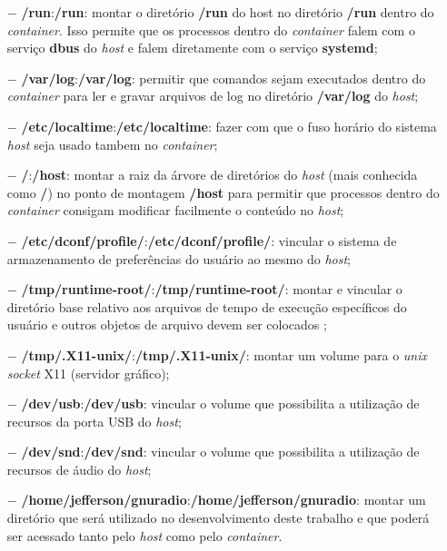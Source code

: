\documentclass[
  12pt,				%
  openright,			%
  twoside,			%
  a4paper,			%
  english,			%
  french,				%
  spanish,			%
  brazil,				%
  ]{abntex2}
\begin{document}
\begin{itemize}
  \item[$-$] \textbf{/run}:\textbf{/run}: montar o diretório \textbf{/run} do host no diretório \textbf{/run} dentro do \textit{container}. Isso permite que os processos dentro do
        \textit{container} falem com o serviço \textbf{dbus} do \textit{host} e falem diretamente com o serviço \textbf{systemd};

  \item[$-$] \textbf{/var/log}:\textbf{/var/log}: permitir que comandos sejam executados dentro do \textit{container} para ler e gravar arquivos de log no diretório
        \textbf{/var/log} do \textit{host};

  \item[$-$] \textbf{/etc/localtime}:\textbf{/etc/localtime}: fazer com que o fuso horário do sistema \textit{host} seja usado
        tambem no \textit{container};

  \item[$-$] \textbf{/}:\textbf{/host}: montar a raiz da árvore de diretórios do \textit{host} (mais conhecida como \textbf{/}) no  ponto
        de montagem \textbf{/host} para permitir que processos dentro do \textit{container} consigam modificar facilmente o conteúdo no \textit{host};

  \item[$-$] \textbf{/etc/dconf/profile/}:\textbf{/etc/dconf/profile/}: vincular o sistema de armazenamento de preferências do usuário ao mesmo do \textit{host};

  \item[$-$] \textbf{/tmp/runtime-root/}:\textbf{/tmp/runtime-root/}: montar e vincular o diretório base relativo aos arquivos de
        tempo de execução específicos do usuário e outros objetos de arquivo devem ser colocados ;

  \item[$-$] \textbf{/tmp/.X11-unix/}:\textbf{/tmp/.X11-unix/}: montar um volume para o \textit{unix socket} X11 (servidor gráfico);

  \item[$-$] \textbf{/dev/usb}:\textbf{/dev/usb}: vincular o volume que possibilita a utilização de recursos da porta USB do \textit{host};

  \item[$-$] \textbf{/dev/snd}:\textbf{/dev/snd}: vincular o volume que possibilita a utilização de recursos de áudio do \textit{host};

  \item[$-$] \textbf{/home/jefferson/gnuradio}:\textbf{/home/jefferson/gnuradio}: montar um diretório que será utilizado no desenvolvimento
        deste trabalho e que poderá ser acessado tanto pelo \textit{host} como pelo \textit{container}.
\end{itemize}
\end{document}
